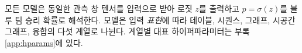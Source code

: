 
모든 모델은 동일한 관측 창 텐서를 입력으로 받아 로짓 $z$를 출력하고 $p = \sigma(z)$를 블루 팀 승리 확률로 해석한다. 모델은 입력 \emph{표현}에 따라 테이블, 시퀀스, 그래프, 시공간 그래프, 융합의 다섯 계열로 나뉜다. 계열별 대표 하이퍼파라미터는 부록 \ref{app:hparams}에 있다.
